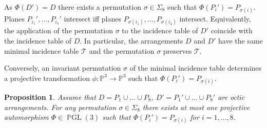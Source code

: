 \documentclass[12pt]{amsart}
\theoremstyle{plain}
\newtheorem{prop}[theorem]{Proposition}
\theoremstyle{remark}
\theoremstyle{definition}
\newcommand{\PP}{\mathbb P}
\newcommand{\lra}{\longrightarrow}
\newcommand\mt{{\mathcal T}}
\numberwithin{table}{section}
\begin{document}
As $\Phi(D')=D$ there exists a permutation $\sigma\in\Sigma_{8}$ such
that $\Phi (P_{i}')=P_{\sigma(i)}$. Planes
$P_{i_{1}}',\dots,P_{i_{4}}'$ intersect iff planes
$P_{\sigma(i_{1})},\dots,P_{\sigma(i_{4})}$ intersect. Equivalently,
the application of the permutation $\sigma$ to the incidence table of $D'$
coincide with the incidence table of $D$. In particular, the
arrangements $D$ and $D'$ have the same minimal incidence table $\mathcal
T$ and the permutation $\sigma$ preserves $\mt$.

Conversely, an invariant permutation $\sigma$ of the minimal incidence table
determines a projective transformation $\phi:\PP^3\lra\PP^3$ such that
$\Phi(P_{i}')=P_{\sigma(i)}$.
\begin{prop}\label{p:uniq}
	Assume that $ D=P_1\cup\dots\cup P_8 $, $ D'=P_1'\cup\dots\cup P_8' $ are octic arrangements. For any permutation $\sigma\in\Sigma_8$ there exists at most one projective automorphism $\Phi\in\operatorname{\mathbb PGL}(3)$ such that $\Phi(P_i')=P_{\sigma(i)}$ for $i=1,\dots,8$.
\end{prop}
\end{document}
